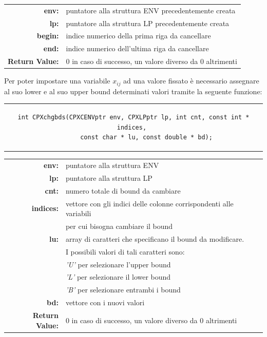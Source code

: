 \begin{table}[h]
\centering
\begin{tabular}{rl}
\textbf{env:} & {puntatore alla struttura ENV precedentemente creata}\\
\textbf{lp:} & {puntatore alla struttura LP precedentemente creata}\\
\textbf{begin:} & {indice numerico della prima riga da cancellare}\\
\textbf{end:} & {indice numerico dell'ultima riga da cancellare}\\
\textbf{Return Value:} & {0 in caso di successo, un valore diverso da 0 altrimenti}\\
\end{tabular}
\end{table} 
\vspace{2 cm}
Per poter impostare una variabile $x_{ij}$ ad una valore fissato è necessario assegnare al suo lower e al suo upper bound determinati valori tramite la seguente funzione:
\begin{center}
\begin{tabular}{c}
\begin{lstlisting}[linewidth=375pt, basicstyle=\footnotesize\sffamily,]   
int CPXchgbds(CPXCENVptr env, CPXLPptr lp, int cnt, const int * indices, 
		const char * lu, const double * bd); 
\end{lstlisting}
\end{tabular}
\end{center}
\begin{table}[h]
\centering
\begin{tabular}{rl}
\textbf{env:} & {puntatore alla struttura ENV}\\
\textbf{lp:} & {puntatore alla struttura LP}\\
\textbf{cnt:} & {numero totale di bound da cambiare}\\
\textbf{indices:} & {vettore con gli indici delle colonne corrispondenti alle variabili}\\
&{per cui bisogna cambiare il bound}\\
\textbf{lu:} & {array di caratteri che specificano il bound da modificare.}\\
&{I possibili valori di tali caratteri sono:}\\
&{\textit{'U'} per selezionare l'upper bound}\\
&{\textit{'L'} per selezionare il lower bound}\\
&{\textit{'B'} per  selezionare entrambi i bound}\\
\textbf{bd:} & {vettore con i nuovi valori}\\
\textbf{Return Value:} & {0 in caso di successo, un valore diverso da 0 altrimenti}\\
\end{tabular}
\end{table}
